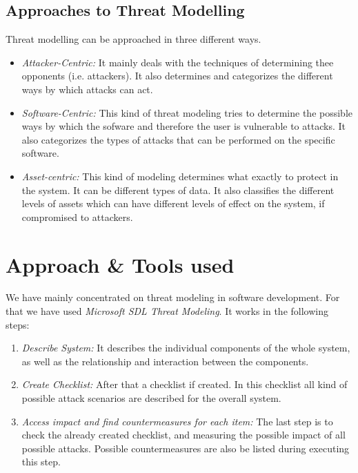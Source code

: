 \documentclass{IEEEtran}
\begin{document}
\subsection{Approaches to Threat Modelling}
\label{subsec:approach-threat-modelling}
Threat modelling can be approached in three different ways.
\begin{itemize}
	\item \emph{Attacker-Centric:} It mainly deals with the techniques of determining thee opponents (i.e. attackers). It also determines and categorizes the different ways by which attacks can act.
	
	\item \emph{Software-Centric:} This kind of threat modeling tries to determine the possible ways by which the sofware and therefore the user is vulnerable to attacks. It also categorizes the types of attacks that can be performed on the specific software.
	
	\item \emph{Asset-centric:} This kind of modeling determines what exactly to protect in the system. It can be different types of data. It also classifies the different levels of assets which can have different levels of effect on the system, if compromised to attackers.
\end{itemize}

\section{Approach \& Tools used}
\label{sec:tools-used}
We have mainly concentrated on threat modeling in software development. For that we have used \emph{Microsoft SDL Threat Modeling}. It works in the following steps: 
\begin{enumerate}
	\item \emph{Describe System:} It describes the individual components of the whole system, as well as the relationship and interaction between the components. 
	\item \emph{Create Checklist:} After that a checklist if created. In this checklist all kind of possible attack scenarios are described for the overall system.
	\item \emph{Access impact and find countermeasures for each item:} The last step is to check the already created checklist, and measuring the possible impact of all possible attacks. Possible countermeasures are also be listed during executing this step.
\end{enumerate}
\end{document}
